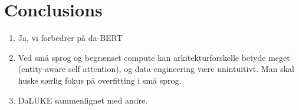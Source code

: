 \documentclass[main.tex]{subfiles}
\begin{document}
\chapter{Conclusions}

\begin{enumerate}
    \item Ja, vi forbedrer på da-BERT
    \item Ved små sprog og begrænset compute kan arkitekturforskelle betyde meget (entity-aware self attention), og data-engineering være unintuitivt.
        Man skal huske særlig fokus på overfitting i små sprog.
    \item DaLUKE sammenlignet med andre.
\end{enumerate}
\end{document}

